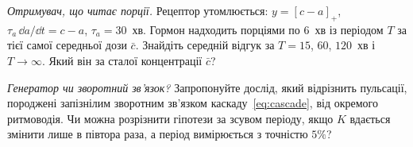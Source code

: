 \begin{exercise}[\lvlB]
\label{ex:16:6}
\emph{Отримувач, що читає порції.} Рецептор утомлюється: $y=[c-a]_+$, $\tau_a\,\dd a/\dd t=c-a$, $\tau_a=30$~хв. Гормон надходить порціями по $6$~хв із періодом $T$ за тієї самої середньої дози $\bar c$. Знайдіть середній відгук за $T=15$, $60$, $120$~хв і $T\to\infty$. Який він за сталої концентрації $\bar c$?
\end{exercise}

\begin{exercise}[\lvlC]
\label{ex:16:7}
\emph{Генератор чи зворотний зв'язок?} Запропонуйте дослід, який відрізнить пульсації, породжені запізнілим зворотним зв'язком каскаду~\eqref{eq:cascade}, від окремого ритмоводія. Чи можна розрізнити гіпотези за зсувом періоду, якщо $K$ вдається змінити лише в півтора раза, а період вимірюється з точністю $5\%$?
\end{exercise}
